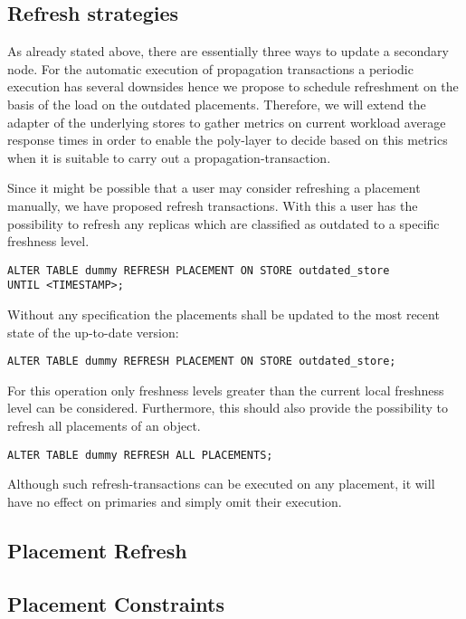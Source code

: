 



\subsection{Refresh strategies}
As already stated above, there are essentially three ways to update a secondary node. 
For the automatic execution of propagation transactions a periodic execution has several downsides hence we propose to schedule
refreshment on the basis of the load on the outdated placements. Therefore, we will extend the adapter of the underlying stores to gather metrics on current workload
average response times in order to enable the poly-layer to decide based on this metrics when it is suitable to carry out a propagation-transaction.


Since it might be possible that a user may consider refreshing a placement manually, we have proposed refresh transactions. With this a user has the possibility to refresh
any replicas which are classified as outdated to a specific freshness level.
\begin{verbatim}
ALTER TABLE dummy REFRESH PLACEMENT ON STORE outdated_store 
UNTIL <TIMESTAMP>;
\end{verbatim}
Without any specification the placements shall be updated to the most recent state of the up-to-date version:
\begin{verbatim}
ALTER TABLE dummy REFRESH PLACEMENT ON STORE outdated_store;
\end{verbatim}

For this operation only freshness levels greater than the current local freshness level can be considered.
Furthermore, this should also provide the possibility to refresh all placements of an object.
\begin{verbatim}
ALTER TABLE dummy REFRESH ALL PLACEMENTS;
\end{verbatim}

Although such refresh-transactions can be executed on any placement, it will have no effect on primaries and simply omit their execution. 

\subsection{Placement Refresh}


\subsection{Placement Constraints}

